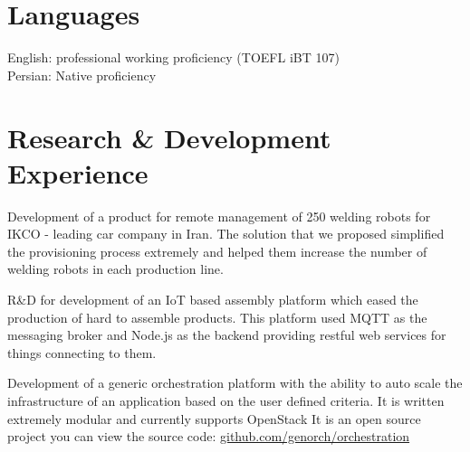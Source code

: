 \documentclass[]{deedy-resume-openfont}
\begin{document}
\begin{minipage}[t]{0.33\textwidth}
\section{Languages}
English: professional working proficiency (TOEFL iBT 107) \\
Persian: Native proficiency

%
%

\end{minipage}
\hfill
\begin{minipage}[t]{0.66\textwidth}


\section{Research \& Development Experience}
    \vspace{\topsep} %
    \begin{tightemize}
    \item Development of a product for remote management of 250 welding robots
        for IKCO - leading car company in Iran. The solution that we proposed
        simplified the provisioning process extremely and helped them increase
        the number of welding robots in each production line.

    \item R\&D for development of an IoT based assembly platform which eased
        the production of hard to assemble products. This platform used MQTT
        as the messaging broker and Node.js as the backend providing restful
        web services for things connecting to them.
    \end{tightemize}

\sectionsep

    Development of a generic orchestration platform with the ability to
    auto scale the infrastructure of an application based on the user defined
    criteria. It is written extremely modular and currently supports OpenStack
    It is an open source project you can view the source code: \href{https://github.com/genorch/orchestration}{github.com/genorch/orchestration}
\sectionsep


\end{minipage}
\end{document}
